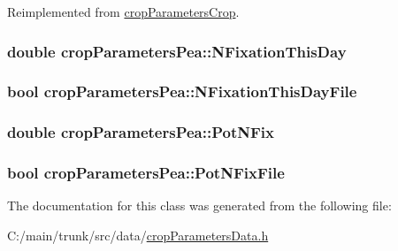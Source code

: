 Reimplemented from \hyperlink{classcrop_parameters_crop_adfe5af221285232e8a50669ccb0c8064}{cropParametersCrop}.\hypertarget{classcrop_parameters_pea_aae414e6045b219e8cf2b82f0ccbc02b1}{
\subsubsection[{NFixationThisDay}]{\setlength{\rightskip}{0pt plus 5cm}double {\bf cropParametersPea::NFixationThisDay}}}
\label{classcrop_parameters_pea_aae414e6045b219e8cf2b82f0ccbc02b1}
\hypertarget{classcrop_parameters_pea_aa7e186245ac13fffb3574227d16b5e5e}{
\subsubsection[{NFixationThisDayFile}]{\setlength{\rightskip}{0pt plus 5cm}bool {\bf cropParametersPea::NFixationThisDayFile}}}
\label{classcrop_parameters_pea_aa7e186245ac13fffb3574227d16b5e5e}
\hypertarget{classcrop_parameters_pea_a0707df054eba7b3a7619c9e25f10244c}{
\subsubsection[{PotNFix}]{\setlength{\rightskip}{0pt plus 5cm}double {\bf cropParametersPea::PotNFix}}}
\label{classcrop_parameters_pea_a0707df054eba7b3a7619c9e25f10244c}
\hypertarget{classcrop_parameters_pea_abb98059ba682d3169c60d2fc87d66364}{
\subsubsection[{PotNFixFile}]{\setlength{\rightskip}{0pt plus 5cm}bool {\bf cropParametersPea::PotNFixFile}}}
\label{classcrop_parameters_pea_abb98059ba682d3169c60d2fc87d66364}


The documentation for this class was generated from the following file:\begin{DoxyCompactItemize}
\item 
C:/main/trunk/src/data/\hyperlink{crop_parameters_data_8h}{cropParametersData.h}\end{DoxyCompactItemize}
